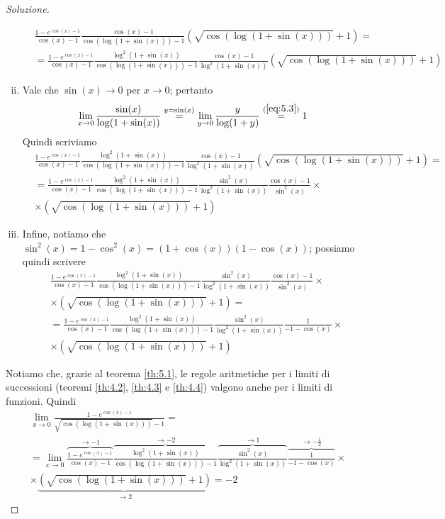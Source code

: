 \begin{proof}[Soluzione]
\begin{enumerate}[(i)]
\[\begin{split}
            &\frac{1-e^{\cos(x)-1}}{\cos(x)-1}\frac{\cos(x)-1}{{\cos(\log(1+\sin(x)))}-1}(\sqrt{\cos(\log(1+\sin(x)))}+1) = \\
            & = \frac{1-e^{\cos(x)-1}}{\cos(x)-1}\frac{\log^2(1+\sin(x))}{{\cos(\log(1+\sin(x)))}-1}\frac{\cos(x)-1}{\log^2(1+\sin(x))}(\sqrt{\cos(\log(1+\sin(x)))}+1)
        \end{split}
        \]
        \item Vale che $\sin(x)\to 0$ per $x\to 0$; pertanto
        \[
        \lim_{x\to 0} \frac{\sin(x)}{\log(1+\sin(x))} \overset{y=\sin(x)}{=} \lim_{y\to 0} \frac{y}{\log(1+y)} \overset{(\ref{eq:5.3})}{=} 1
        \]
        Quindi scriviamo
        \[
        \begin{split}
            &\frac{1-e^{\cos(x)-1}}{\cos(x)-1}\frac{\log^2(1+\sin(x))}{{\cos(\log(1+\sin(x)))}-1}\frac{\cos(x)-1}{\log^2(1+\sin(x))}(\sqrt{\cos(\log(1+\sin(x)))}+1) = \\
            & = \frac{1-e^{\cos(x)-1}}{\cos(x)-1}\frac{\log^2(1+\sin(x))}{{\cos(\log(1+\sin(x)))}-1}\frac{\sin^2(x)}{\log^2(1+\sin(x))}\frac{\cos(x)-1}{\sin^2(x)}\times \\
            & \times (\sqrt{\cos(\log(1+\sin(x)))}+1)
        \end{split}
        \]
        \item Infine, notiamo che $\sin^2(x) = 1-\cos^2(x) = (1+\cos(x))(1-\cos(x))$; possiamo quindi scrivere
        \[
        \begin{split}
            & \frac{1-e^{\cos(x)-1}}{\cos(x)-1}\frac{\log^2(1+\sin(x))}{{\cos(\log(1+\sin(x)))}-1}\frac{\sin^2(x)}{\log^2(1+\sin(x))}\frac{\cos(x)-1}{\sin^2(x)}\times \\
            & \times (\sqrt{\cos(\log(1+\sin(x)))}+1) = \\
            & = \frac{1-e^{\cos(x)-1}}{\cos(x)-1}\frac{\log^2(1+\sin(x))}{{\cos(\log(1+\sin(x)))}-1}\frac{\sin^2(x)}{\log^2(1+\sin(x))}\frac{1}{-1-\cos(x)}\times \\
            & \times (\sqrt{\cos(\log(1+\sin(x)))}+1)
        \end{split}
        \]
    \end{enumerate}
    Notiamo che, grazie al teorema \ref{th:5.1}, le regole aritmetiche per i limiti di successioni (teoremi \ref{th:4.2}, \ref{th:4.3} e \ref{th:4.4}) valgono anche per i limiti di funzioni. Quindi
    \[
     \begin{split}
         & \lim_{x\to 0} \frac{1-e^{\cos(x)-1}}{\sqrt{\cos(\log(1+\sin(x)))}-1} = \\
         & = \lim_{x\to 0} \overbrace{\frac{1-e^{\cos(x)-1}}{\cos(x)-1}}^{\to -1}\overbrace{\frac{\log^2(1+\sin(x))}{{\cos(\log(1+\sin(x)))}-1}}^{\to -2}\overbrace{\frac{\sin^2(x)}{\log^2(1+\sin(x))}}^{\to 1} \overbrace{\frac{1}{-1-\cos(x)}}^{\to -\frac{1}{2}}\times \\
            & \times \underbrace{(\sqrt{\cos(\log(1+\sin(x)))}+1)}_{\to 2} = -2 
     \end{split}
    \]
\end{proof}
